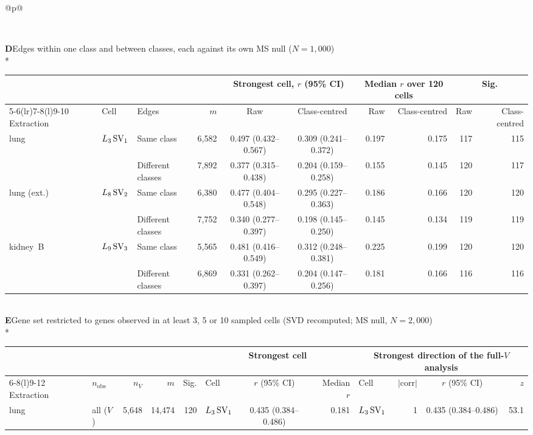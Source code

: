 \begin{longtable}{@{}p{\textwidth}@{}}
{\begin{tabular*}{\textwidth}{@{\extracolsep{\fill}}>{\raggedright\arraybackslash}p{3.5cm}crrcrrcrr@{}}
\end{tabular*}}\\
\midrule
\textbf{D}\enspace Edges within one class and between classes, each against its own MS null ($N = 1{,}000$)\\*
{\scriptsize\begin{tabular*}{\textwidth}{@{\extracolsep{\fill}}lllrccrrrr@{}}
& & & & \multicolumn{2}{c}{Strongest cell, $r$ (95\% CI)} & \multicolumn{2}{c}{Median $r$ over 120 cells} & \multicolumn{2}{c}{Sig.} \\
\cmidrule(lr){5-6}\cmidrule(lr){7-8}\cmidrule(l){9-10}
Extraction & Cell & Edges & $m$ & Raw & Class-centred & Raw & Class-centred & Raw & Class-centred \\
\midrule
lung & $L_{3}\,\mathrm{SV}_{1}$ & Same class & 6,582 & 0.497 (0.432--0.567) & 0.309 (0.241--0.372) & 0.197 & 0.175 & 117 & 115 \\
 &  & Different classes & 7,892 & 0.377 (0.315--0.438) & 0.204 (0.159--0.258) & 0.155 & 0.145 & 120 & 117 \\
lung (ext.) & $L_{8}\,\mathrm{SV}_{2}$ & Same class & 6,380 & 0.477 (0.404--0.548) & 0.295 (0.227--0.363) & 0.186 & 0.166 & 120 & 120 \\
 &  & Different classes & 7,752 & 0.340 (0.277--0.397) & 0.198 (0.145--0.250) & 0.145 & 0.134 & 119 & 119 \\
kidney~B & $L_{9}\,\mathrm{SV}_{3}$ & Same class & 5,565 & 0.481 (0.416--0.549) & 0.312 (0.248--0.381) & 0.225 & 0.199 & 120 & 120 \\
 &  & Different classes & 6,869 & 0.331 (0.262--0.397) & 0.204 (0.147--0.256) & 0.181 & 0.166 & 116 & 116 \\
\end{tabular*}}\\
\midrule
\textbf{E}\enspace Gene set restricted to genes observed in at least 3, 5 or 10 sampled cells (SVD recomputed; MS null, $N = 2{,}000$)\\*
{\scriptsize\begin{tabular*}{\textwidth}{@{\extracolsep{\fill}}llrrrlcrlrcr@{}}
& & & & & \multicolumn{3}{c}{Strongest cell} & \multicolumn{4}{c}{Strongest direction of the full-$V$ analysis} \\
\cmidrule(lr){6-8}\cmidrule(l){9-12}
Extraction & $n_{\mathrm{obs}}$ & $n_V$ & $m$ & Sig. & Cell & $r$ (95\% CI) & Median $r$ & Cell & $|$corr$|$ & $r$ (95\% CI) & $z$ \\
\midrule
lung & all ($V$) & 5,648 & 14,474 & 120 & $L_{3}\,\mathrm{SV}_{1}$ & 0.435 (0.384--0.486) & 0.181 & $L_{3}\,\mathrm{SV}_{1}$ & 1 & 0.435 (0.384--0.486) & 53.1 \\

\end{tabular*}}
\end{longtable}
